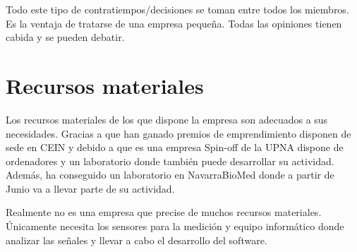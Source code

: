 Todo este tipo de contratiempos/decisiones se toman entre todos los miembros. Es la ventaja de tratarse de una empresa pequeña. Todas las opiniones tienen cabida y se pueden debatir.

	
	
	\section{Recursos materiales}

Los recursos materiales de los que dispone la empresa son adecuados a sus necesidades.
Gracias a que han ganado premios de emprendimiento disponen de sede en CEIN y debido a que es una empresa Spin-off de la UPNA dispone de ordenadores y un laboratorio donde también puede desarrollar su actividad. Además, ha conseguido un laboratorio en NavarraBioMed donde a partir de Junio va a llevar parte de su actividad.

Realmente no es una empresa que precise de muchos recursos materiales. Únicamente necesita los sensores para la medición y equipo informático donde analizar las señales y llevar a cabo el desarrollo del software.
	
	
